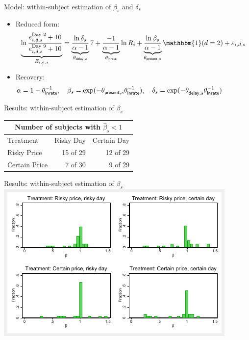 \documentclass[professionalfont,10pt]{beamer}
\begin{document}
\begin{frame}{Model: within-subject estimation of $\beta_s$ and $\delta_s$}
\begin{itemize}[<+->]
\item Reduced form:
$$ \underbrace{ \ln \frac{e_{i,d,s}^\text{Day 2}+10}{e_{i,d,s}^\text{Day 9}+10} }_{E_{i,d,s}} = \underbrace{ \frac{\ln \delta_s}{\alpha - 1} }_{\theta_{\textsf{delay},s}} 7 + \underbrace{ \frac{-1}{\alpha - 1} }_{\theta_{\textsf{lnrate}}} \ln R_i + \underbrace{ \frac{\ln \beta_s}{\alpha - 1} }_{\theta_{\textsf{present},s}} \mathbbm{1}(d=2) + \varepsilon_{i,d,s}$$
\item Recovery: $\alpha=1-\theta_{\textsf{lnrate}}^{-1}, \quad \beta_s=\exp(-\theta_{\textsf{present},s}^{\strut}\theta_{\textsf{lnrate}}^{-1}), \quad \delta_s=\exp(-\theta_{\textsf{delay},s}^{\strut}\theta_{\textsf{lnrate}}^{-1})$
\end{itemize}
\end{frame}

\begin{frame}{Results: within-subject estimation of $\beta_s$}
 \begin{center}
    \begin{tabular}{lrr}
    \toprule
    \multicolumn{3}{c}{Number of subjects with $\hat\beta_s<1$} \\
    \midrule
        Treatment & \hspace{1em} Risky Day & \hspace{1em} Certain Day \\
    \midrule
      Risky Price &  15 of 29 &    12 of 29 \\
    Certain Price &   7 of 30 &     9 of 29 \\
    \bottomrule
    \end{tabular}
 \end{center}
\end{frame}

\begin{frame}{Results: within-subject estimation of $\beta_s$}
\includegraphics[width=\textwidth, trim=0.2cm 0.3cm 0.2cm 0.2cm, clip]{stata_graphics/beta_hist--2x2.pdf}
\end{frame}
\end{document}
